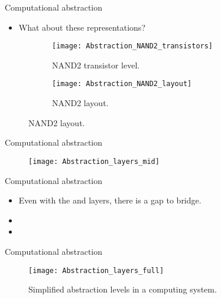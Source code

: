 \begin{frame}{Computational abstraction}
\begin{itemize}
  \item What about these representations?
\end{itemize}
\begin{figure}[!htb]
  \centering
  \begin{minipage}{.45\linewidth}
      \begin{figure}[!htb]
    \centering
    \texttt{[image: Abstraction\_NAND2\_transistors]}
    \caption{NAND2 transistor level.}
    \label{Figure:NAND2_transistor}
  \end{figure}
  \end{minipage}
  \begin{minipage}{.45\linewidth}
      \begin{figure}[!htb]
    \centering
    \texttt{[image: Abstraction\_NAND2\_layout]}
    \caption{NAND2 layout.}
    \label{Figure:NAND2_layout2}
  \end{figure}
  \end{minipage}
\end{figure}
\end{frame}

\begin{frame}{Computational abstraction}
\begin{figure}[!htb]
  \centering
  \texttt{[image: Abstraction\_layers\_mid]}
  \label{Figure:Abstraction_mid}
\end{figure}
\end{frame}

\begin{frame}{Computational abstraction}
\begin{itemize}
\item Even with the  and  layers, there is a gap to bridge.
\item {}
\pauseprint
\item {}
\end{itemize}
\end{frame}

\begin{frame}{Computational abstraction}
\begin{figure}[!htb]
  \centering
  \texttt{[image: Abstraction\_layers\_full]}
  \caption{Simplified abstraction levels in a computing system.}
  \label{Figure:Abstraction_full}
\end{figure}
\end{frame}

